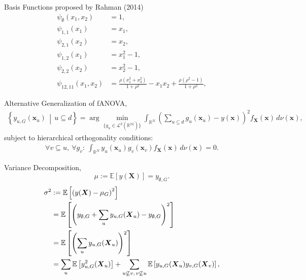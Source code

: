 \begin{frame}{Basis Functions proposed by Rahman (2014)\cite{rahman2014}}
    \begin{align*}
\psi_{\emptyset}(x_1,x_2) &= 1, \\[0.5em]
\psi_{1,1}(x_1) &= x_1, \\[0.5em]
\psi_{2,1}(x_2) &= x_2, \\[0.5em]
\psi_{1,2}(x_1) &= x_1^2 - 1, \\[0.5em]
\psi_{2,2}(x_2) &= x_2^2 - 1, \\[0.5em]
\psi_{12,11}(x_1,x_2) &= \frac{\rho (x_1^2 + x_2^2)}{1 + \rho^2} 
                         - x_1 x_2 
                         + \frac{\rho(\rho^2 - 1)}{1 + \rho^2},
\end{align*}
\end{frame}

\begin{frame}{Alternative Generalization of fANOVA, \cite{hooker2007}}
    \begin{align*}
\left\{ y_{u, G}(\boldsymbol{x}_u) \,\middle|\, u \subseteq d \right\}
= \arg\min_{\{g_u \in \mathcal{L}^2(\mathbb{R}^{|u|})\}} 
\int_{\mathbb{R}^N} \left( \sum_{u \subseteq d} g_u(\boldsymbol{x}_u) - y(\boldsymbol{x}) \right)^2 
f_{\boldsymbol{X}}(\boldsymbol{x}) \, d \nu (\boldsymbol{x}),
\label{eq:generalized_fanova_components_hooker}
\end{align*}
subject to hierarchical orthogonality conditions:
\begin{align*}
    \forall v \subseteq u,\ \forall g_v:\ 
    \int_{\mathbb{R}^N} y_u(\boldsymbol{x}_u) g_v(\boldsymbol{x}_v) 
    f_{\boldsymbol{X}}(\boldsymbol{x}) \, d \nu (\boldsymbol{x}) = 0.
\end{align*}
\end{frame}

\begin{frame}{Variance Decomposition, \cite{sobol1993sensitivity}}
    \[
    \mu := \mathbb{E}[y(\boldsymbol{X})] = y_{\emptyset,G}.
    \]
    \begin{align*}
\sigma^2 
&:= \mathbb{E}\left[ \left( y(\boldsymbol{X}) - \mu_G \right)^2 \right] \notag \\
&= \mathbb{E} \left[ \left( y_{\emptyset,G} + \sum_{u} y_{u,G}(\boldsymbol{X}_u) - y_{\emptyset,G} \right)^2 \right] \notag \\
&= \mathbb{E} \left[ \left( \sum_{u} y_{u,G}(\boldsymbol{X}_u) \right)^2 \right] \notag \\
&= \sum_{u} \mathbb{E} \left[ y_{u,G}^2(\boldsymbol{X}_u) \right]
+ \sum_{\substack{u \not\subseteq v,\, v \not\subseteq u}} 
\mathbb{E} \left[ y_{u,G}(\boldsymbol{X}_u) y_{v,G}(\boldsymbol{X}_v) \right],
\end{align*}
    
\end{frame}

